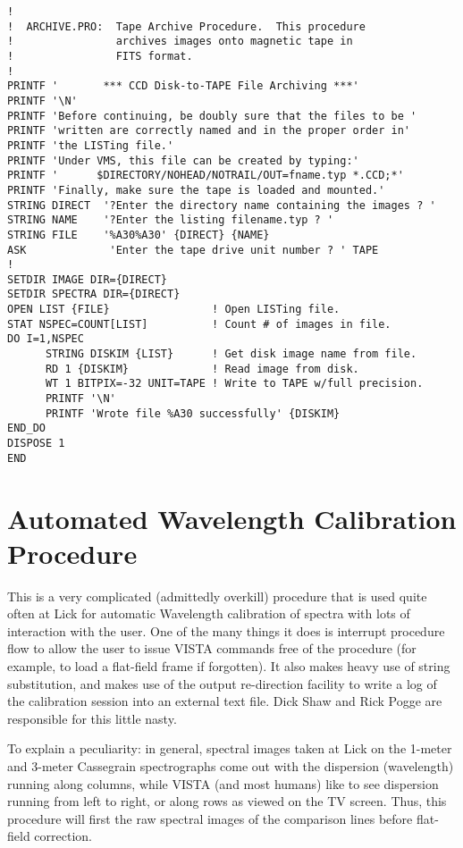 \begin{verbatim}
!
!  ARCHIVE.PRO:  Tape Archive Procedure.  This procedure
!                archives images onto magnetic tape in
!                FITS format.
!
PRINTF '       *** CCD Disk-to-TAPE File Archiving ***'
PRINTF '\N'
PRINTF 'Before continuing, be doubly sure that the files to be '
PRINTF 'written are correctly named and in the proper order in'
PRINTF 'the LISTing file.'
PRINTF 'Under VMS, this file can be created by typing:'
PRINTF '      $DIRECTORY/NOHEAD/NOTRAIL/OUT=fname.typ *.CCD;*'
PRINTF 'Finally, make sure the tape is loaded and mounted.'
STRING DIRECT  '?Enter the directory name containing the images ? '
STRING NAME    '?Enter the listing filename.typ ? '
STRING FILE    '%A30%A30' {DIRECT} {NAME}
ASK             'Enter the tape drive unit number ? ' TAPE
!
SETDIR IMAGE DIR={DIRECT}
SETDIR SPECTRA DIR={DIRECT}
OPEN LIST {FILE}                ! Open LISTing file.
STAT NSPEC=COUNT[LIST]          ! Count # of images in file.
DO I=1,NSPEC
      STRING DISKIM {LIST}      ! Get disk image name from file.
      RD 1 {DISKIM}             ! Read image from disk.
      WT 1 BITPIX=-32 UNIT=TAPE ! Write to TAPE w/full precision.
      PRINTF '\N'
      PRINTF 'Wrote file %A30 successfully' {DISKIM}
END_DO
DISPOSE 1
END
\end{verbatim}


\section{Automated Wavelength Calibration Procedure}

This is a very complicated (admittedly overkill) procedure that is used quite
often at Lick for automatic Wavelength calibration of spectra with lots of
interaction with the user.  One of the many things it does is interrupt
procedure flow to allow the user to issue VISTA commands free of the procedure
(for example, to load a flat-field frame if forgotten).  It also makes heavy
use of string substitution, and makes use of the output re-direction facility
to write a log of the calibration session into an external text file.  Dick
Shaw and Rick Pogge are responsible for this little nasty.

To explain a peculiarity: in general, spectral images taken at Lick on the
1-meter and 3-meter Cassegrain spectrographs come out with the dispersion
(wavelength) running along columns, while VISTA (and most humans) like to see
dispersion running from left to right, or along rows as viewed on the TV
screen.  Thus, this procedure will first  the raw spectral images
of the comparison lines before flat-field correction.

